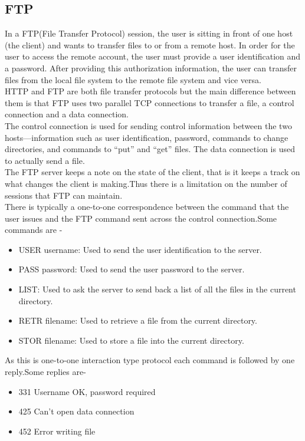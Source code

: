 \documentclass{article}
\begin{document}
\subsection{FTP}
In a FTP(File Transfer Protocol) session, the user is sitting in front of one host (the client) and wants to transfer files to or from a remote host. In order for the user to access the remote account, the user must provide a user identification and a password. After providing this authorization information, the user can transfer files from the local file system to the remote file system and vice versa.\\
HTTP and FTP are both file transfer protocols but the main difference between them is that FTP uses two parallel TCP connections to transfer a file, a control connection and a data connection.\\
The control connection is used for sending control information between the two hosts—information such as user identification, password, commands to change directories, and commands to “put” and “get” files. The data connection is used to actually send a file.\\
The FTP server keeps a note on the state of the client, that is it keeps a track on what changes the client is making.Thus there is a limitation on the number of sessions that FTP can maintain.\\
There is typically a one-to-one correspondence between the command that the user issues and the FTP command sent across the control connection.Some commands are -
\begin{itemize}
    \item USER username: Used to send the user identification to the server.
    \item PASS password: Used to send the user password to the server.
    \item LIST: Used to ask the server to send back a list of all the files in the current directory.
    \item RETR filename: Used to retrieve a file from the current directory.
    \item STOR filename: Used to store a file into the current directory.
\end{itemize}
As this is one-to-one interaction type protocol each command is followed by one reply.Some replies are-
\begin{itemize}
    \item 331 Username OK, password required
    \item 425 Can’t open data connection
    \item 452 Error writing file
\end{itemize}
\end{document}
